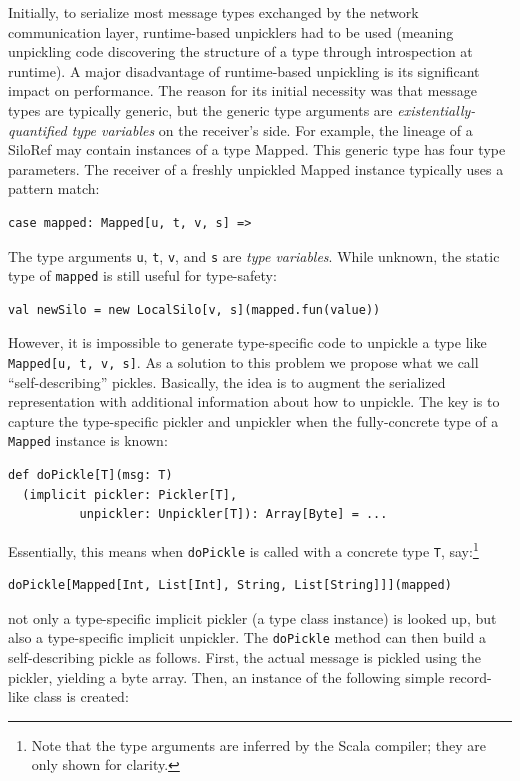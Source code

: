 \documentclass{jfp1}
\begin{document}
Initially, to serialize most message types exchanged by the network
communication layer, runtime-based unpicklers had to be used (meaning unpickling
code discovering the structure of a type through introspection at runtime). A
major disadvantage of runtime-based unpickling is its significant impact on
performance. The reason for its initial necessity was that message types are
typically generic, but the generic type arguments are {\em
existentially-quantified type variables} on the receiver's side. For example,
the lineage of a SiloRef may contain instances of a type Mapped. This generic
type has four type parameters. The receiver of a freshly unpickled Mapped
instance typically uses a pattern match:

\begin{lstlisting}
case mapped: Mapped[u, t, v, s] =>
\end{lstlisting}

The type arguments \verb|u|, \verb|t|, \verb|v|, and \verb|s| are {\em type
variables}. While unknown, the static type of \verb|mapped| is still useful for
type-safety:

\begin{lstlisting}
val newSilo = new LocalSilo[v, s](mapped.fun(value))
\end{lstlisting}

However, it is impossible to generate type-specific code to unpickle a type like
\verb|Mapped[u, t, v, s]|. As a solution to this problem we propose what we call
``self-describing'' pickles. Basically, the idea is to augment the serialized
representation with additional information about how to unpickle. The key is to
capture the type-specific pickler and unpickler when the fully-concrete type of
a \verb|Mapped| instance is known:

\begin{lstlisting}
def doPickle[T](msg: T)
  (implicit pickler: Pickler[T],
          unpickler: Unpickler[T]): Array[Byte] = ...
\end{lstlisting}

Essentially, this means when \verb|doPickle| is called with a concrete type
\verb|T|, say:\footnote{Note that the type arguments are inferred by the Scala
compiler; they are only shown for clarity.}

\begin{lstlisting}
doPickle[Mapped[Int, List[Int], String, List[String]]](mapped)
\end{lstlisting}

\noindent not only a type-specific implicit pickler (a type class instance) is
looked up, but also a type-specific implicit unpickler. The \verb|doPickle|
method can then build a self-describing pickle as follows. First, the actual
message is pickled using the pickler, yielding a byte array. Then, an instance
of the following simple record-like class is created:
\end{document}
